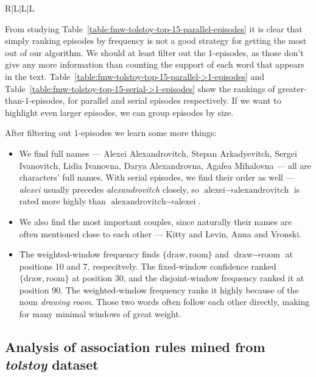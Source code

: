 \begin{table}
\begin{tabulary}{\textwidth}{R|L|L|L}
\end{tabulary}

\caption{The top 15 serial episodes found by our algorithm, excluding 1-episodes, with $ \rho = 15 $, and for the three frequency measures.}
\label{table:fmw-tolstoy-top-15-serial->1-episodes}
\end{table}

From studying Table~\ref{table:fmw-tolstoy-top-15-parallel-episodes} it is clear that simply ranking episodes by frequency is not a good strategy for getting the most out of our algorithm. We should at least filter out the 1-episodes, as those don't give any more information than counting the support of each word that appears in the text. Table~\ref{table:fmw-tolstoy-top-15-parallel->1-episodes} and Table~\ref{table:fmw-tolstoy-top-15-serial->1-episodes} show the rankings of greater-than-1-episodes, for parallel and serial episodes respectively. If we want to highlight even larger episodes, we can group episodes by size.

After filtering out 1-episodes we learn some more things:
\begin{itemize}
\item We find full names --- Alexei Alexandrovitch, Stepan Arkadyevitch, Sergei Ivanovitch, Lidia Ivanovna, Darya Alexandrovna, Agafea Mihalovna --- all are characters' full names. With serial episodes, we find their order as well --- \emph{alexei} usually precedes \emph{alexandrovitch} closely, so $ \text{alexei} \to \text{alexandrovitch} $ is rated more highly than $ \text{alexandrovitch} \to \text{alexei} $.
\item We also find the most important couples, since naturally their names are often mentioned close to each other --- Kitty and Levin, Anna and Vronski.
\item The weighted-window frequency finds $ \{ \text{draw}, \text{room} \} $ and $ \text{draw} \to \text{room} $ at positions 10 and 7, respecitvely. The fixed-window confidence ranked $ \{ \text{draw}, \text{room} \} $ at position 30, and the disjoint-window frequency ranked it at position 90. The weighted-window frequency ranks it highly because of the noun \emph{drawing room}. Those two words often follow each other directly, making for many minimal windows of great weight.
\end{itemize}



\subsection{Analysis of association rules mined from \emph{tolstoy} dataset}

